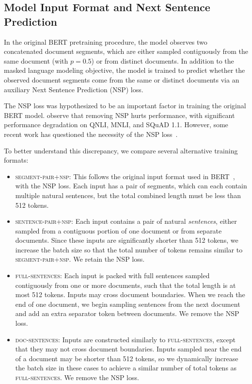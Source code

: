 \subsection{Model Input Format and Next Sentence Prediction} \label{sec:model_input_nsp}



In the original BERT pretraining procedure, the model observes two concatenated document segments, which are either sampled contiguously from the same document (with $p=0.5$) or from distinct documents.
In addition to the masked language modeling objective, the model is trained to predict whether the observed document segments come from the same or distinct documents via an auxiliary Next Sentence Prediction (NSP) loss.

The NSP loss was hypothesized to be an important factor in training the original BERT model.  observe that removing NSP hurts performance, with significant performance degradation on QNLI, MNLI, and SQuAD 1.1.
However, some recent work has questioned the necessity of the NSP loss~\cite{lample2019cross,yang2019xlnet,joshi2019spanbert}.


To better understand this discrepancy, we compare several alternative training formats:
\begin{itemize}[leftmargin=*]
\setlength\itemsep{0em}
\item \textsc{segment-pair+nsp}: This follows the original input format used in BERT~\cite{devlin2018bert}, with the NSP loss. Each input has a pair of segments, which can each contain multiple natural sentences, but the total combined length must be less than 512 tokens.
\item \textsc{sentence-pair+nsp}: Each input contains a pair of natural \emph{sentences}, either sampled from a contiguous portion of one document or from separate documents. Since these inputs are significantly shorter than 512 tokens, we increase the batch size so that the total number of tokens remains similar to \textsc{segment-pair+nsp}. We retain the NSP loss.
\item \textsc{full-sentences}: Each input is packed with full sentences sampled contiguously from one or more documents, such that the total length is at most 512 tokens. Inputs may cross document boundaries. When we reach the end of one document, we begin sampling sentences from the next document and add an extra separator token between documents. We remove the NSP loss.
\item \textsc{doc-sentences}: Inputs are constructed similarly to \textsc{full-sentences}, except that they may not cross document boundaries. Inputs sampled near the end of a document may be shorter than 512 tokens, so we dynamically increase the batch size in these cases to achieve a similar number of total tokens as \textsc{full-sentences}. We remove the NSP loss.
\end{itemize}

